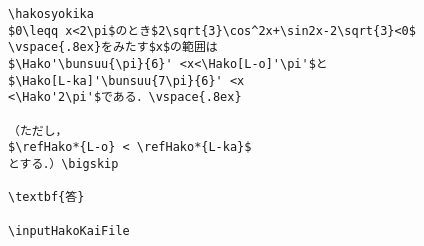 \begin{verbatim}
\hakosyokika
$0\leqq x<2\pi$のとき$2\sqrt{3}\cos^2x+\sin2x-2\sqrt{3}<0$
\vspace{.8ex}をみたす$x$の範囲は
$\Hako'\bunsuu{\pi}{6}' <x<\Hako[L-o]'\pi'$と
$\Hako[L-ka]'\bunsuu{7\pi}{6}' <x
<\Hako'2\pi'$である．\vspace{.8ex}

（ただし，
$\refHako*{L-o} < \refHako*{L-ka}$ 
とする．）\bigskip

\textbf{答}

\inputHakoKaiFile
\end{verbatim}
